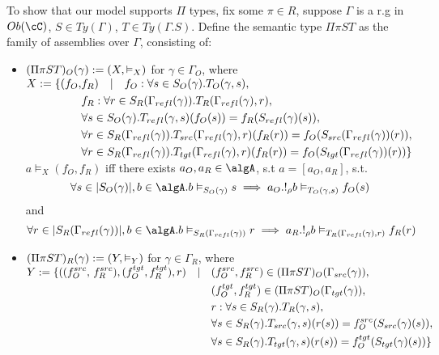 \documentclass[12pt,a4paper]{article}
\def\src{_{src}}\alwaysmath{src}
\def\rfl{_{refl}}\alwaysmath{rfl}
\def\tgt{_{tgt}}\alwaysmath{tgt}
\renewcommand{\O}{_{O}}\alwaysmath{O}
\def\R{_{R}}\alwaysmath{R}
\begin{document}
To show that our model supports $\Pi$ types, fix some $\pi \in R$, suppose $\Gamma$ is a r.g in $\ob\cC$, $S \in Ty(\Gamma)$, $T \in Ty(\Gamma . S)$. 
Define the semantic type $\Pi \pi S T$ as the family of assemblies over $\Gamma$, consisting of:
\begin{itemize}
  \item $(\Pi \pi S T)\O(\gamma) \define (X, \vDash_X)$ for $\gamma \in \Gamma\O$, where
    \subitem
        $\begin{aligned}
          X \define \{ (f\O,& f\R) \quad | \quad f\O : \forall s \in S\O(\gamma).T\O(\gamma, s),\\
          & f\R : \forall r \in S\R(\Gamma\rfl(\gamma)). T\R(\Gamma\rfl(\gamma), r),\\
          & \forall s \in S\O(\gamma). T\rfl(\gamma, s)(f\O (s)) = f\R(S\rfl(\gamma)(s)),\\
          & \forall r \in S\R(\Gamma\rfl(\gamma)). T\src(\Gamma\rfl(\gamma),r)(f\R (r)) = f\O(S\src(\Gamma\rfl(\gamma))(r)),\\
          & \forall r \in S\R(\Gamma\rfl(\gamma)). T\tgt(\Gamma\rfl(\gamma),r)(f\R (r)) = f\O(S\tgt(\Gamma\rfl(\gamma))(r))  \}
        \end{aligned}$\\
    
    \subitem $a \vDash_X (f\O, f\R)$ iff there exists $a\O, a\R \in \algA$, s.t $ a = [a\O, a\R]$, s.t.
    $$\forall s \in \carr{S\O(\gamma)}, b \in \algA . b \vDash_{S\O(\gamma)} s \implies a\O . !_\rho b \vDash_{T\O(\gamma,s)} f\O(s)$$ and 
    $$\forall r \in \carr{S\R(\Gamma\rfl(\gamma))}, b \in \algA . b \vDash_{S\R(\Gamma\rfl(\gamma))} r \implies a\R . !_\rho b \vDash_{T\R(\Gamma\rfl(\gamma),r)} f\R(r)$$ 
    
    \item $(\Pi \pi S T)\R(\gamma) \define (Y, \vDash_Y)$ for $\gamma \in \Gamma\R$, where
    \subitem
     $\begin{aligned}
           Y \define \{( (f\O^{src}, \, f\R^{src}), (f\O^{tgt}, f\R^{tgt}), r)  \quad|\quad
            & (f\O^{src},f\R^{src}) \in (\Pi\pi S T)\O(\Gamma\src(\gamma)),\\
            & (f\O^{tgt},f\R^{tgt}) \in (\Pi\pi S T)\O(\Gamma\tgt(\gamma)),\\
            & r : \forall s \in S\R(\gamma). T\R(\gamma, s),\\     
            & \forall s \in S\R(\gamma). T\src(\gamma, s)( r (s)) = f\O^{src}(S\src(\gamma)(s)),\\
            & \forall s \in S\R(\gamma). T\tgt(\gamma, s)( r (s)) = f\O^{tgt}(S\tgt(\gamma)(s)) \}
      \end{aligned}$\\
    

\end{itemize}
\end{document}
